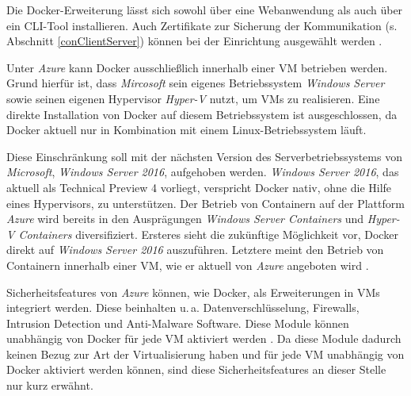 \documentclass[../main.tex]{subfiles}
\begin{document}
      Die Docker-Erweiterung lässt sich sowohl über eine Webanwendung als auch über ein CLI-Tool installieren. Auch Zertifikate zur Sicherung der Kommunikation (s. Abschnitt \ref{conClientServer}) können bei der Einrichtung ausgewählt werden \cite{azureDockerExtension}\cite{azureDockerExtensionCLI}.

      Unter \emph{Azure} kann Docker ausschließlich innerhalb einer VM betrieben werden. Grund hierfür ist, dass \emph{Mircosoft} sein eigenes Betriebssystem \emph{Windows Server} sowie seinen eigenen Hypervisor \emph{Hyper-V} nutzt, um VMs zu realisieren. Eine direkte Installation von Docker auf diesem Betriebssystem ist ausgeschlossen, da Docker aktuell nur in Kombination mit einem Linux-Betriebssystem läuft.

      Diese Einschränkung soll mit der nächsten Version des Serverbetriebssystems von \emph{Microsoft}, \emph{Windows Server 2016}, aufgehoben werden. \emph{Windows Server 2016}, das aktuell als Technical Preview 4 vorliegt, verspricht Docker nativ, ohne die Hilfe eines Hypervisors, zu unterstützen. Der Betrieb von Containern auf der Plattform \emph{Azure} wird bereits in den Ausprägungen \emph{Windows Server Containers} und \emph{Hyper-V Containers} diversifiziert. Ersteres sieht die zukünftige Möglichkeit vor, Docker direkt auf \emph{Windows Server 2016} auszuführen. Letztere meint den Betrieb von Containern innerhalb einer VM, wie er aktuell von \emph{Azure} angeboten wird \cite{dockerPartnershipMicrosoft}\cite{azureWindowsContainers}.


      Sicherheitsfeatures von \emph{Azure} können, wie Docker, als Erweiterungen in VMs integriert werden. Diese beinhalten u.\,a. Datenverschlüsselung, Firewalls, Intrusion Detection und Anti-Malware Software. Diese Module können unabhängig von Docker für jede VM aktiviert werden \cite{azureDockerExtensionSecurity}. Da diese Module dadurch keinen Bezug zur Art der Virtualisierung haben und für jede VM unabhängig von Docker aktiviert werden können, sind diese Sicherheitsfeatures an dieser Stelle nur kurz erwähnt.
\end{document}
